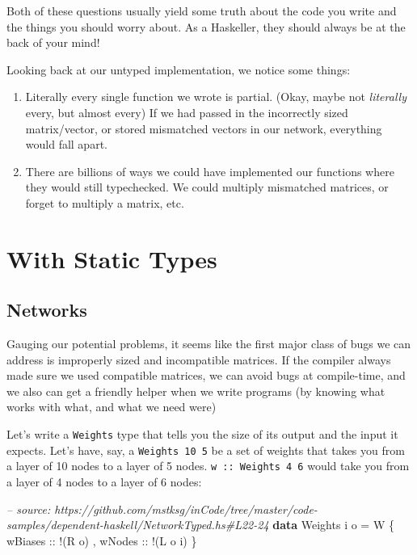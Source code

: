 \documentclass[]{article}
\newenvironment{Shaded}{}{}
\newcommand{\KeywordTok}[1]{\textcolor[rgb]{0.00,0.44,0.13}{\textbf{{#1}}}}
\newcommand{\DataTypeTok}[1]{\textcolor[rgb]{0.56,0.13,0.00}{{#1}}}
\newcommand{\CommentTok}[1]{\textcolor[rgb]{0.38,0.63,0.69}{\textit{{#1}}}}
\newcommand{\OtherTok}[1]{\textcolor[rgb]{0.00,0.44,0.13}{{#1}}}
\newcommand{\FunctionTok}[1]{\textcolor[rgb]{0.02,0.16,0.49}{{#1}}}
\newcommand{\NormalTok}[1]{{#1}}
\begin{document}
Both of these questions usually yield some truth about the code you
write and the things you should worry about. As a Haskeller, they should
always be at the back of your mind!

Looking back at our untyped implementation, we notice some things:

\begin{enumerate}
\def\labelenumi{\arabic{enumi}.}
\tightlist
\item
  Literally every single function we wrote is partial. (Okay, maybe not
  \emph{literally} every, but almost every) If we had passed in the
  incorrectly sized matrix/vector, or stored mismatched vectors in our
  network, everything would fall apart.
\item
  There are billions of ways we could have implemented our functions
  where they would still typechecked. We could multiply mismatched
  matrices, or forget to multiply a matrix, etc.
\end{enumerate}

\section{With Static Types}\label{with-static-types}

\subsection{Networks}\label{networks}

Gauging our potential problems, it seems like the first major class of
bugs we can address is improperly sized and incompatible matrices. If
the compiler always made sure we used compatible matrices, we can avoid
bugs at compile-time, and we also can get a friendly helper when we
write programs (by knowing what works with what, and what we need were)

Let's write a \texttt{Weights} type that tells you the size of its
output and the input it expects. Let's have, say, a
\texttt{Weights\ 10\ 5} be a set of weights that takes you from a layer
of 10 nodes to a layer of 5 nodes. \texttt{w\ ::\ Weights\ 4\ 6} would
take you from a layer of 4 nodes to a layer of 6 nodes:

\begin{Shaded}
\begin{Highlighting}[]
\CommentTok{-- source: https://github.com/mstksg/inCode/tree/master/code-samples/dependent-haskell/NetworkTyped.hs#L22-24}
\KeywordTok{data} \DataTypeTok{Weights} \NormalTok{i o }\FunctionTok{=} \DataTypeTok{W} \NormalTok{\{}\OtherTok{ wBiases ::} \FunctionTok{!}\NormalTok{(}\DataTypeTok{R} \NormalTok{o)}
                     \NormalTok{,}\OtherTok{ wNodes  ::} \FunctionTok{!}\NormalTok{(}\DataTypeTok{L} \NormalTok{o i)}
                     \NormalTok{\}}
\end{Highlighting}
\end{Shaded}
\end{document}
